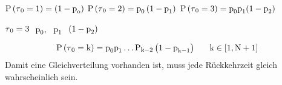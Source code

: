 {\begin{uebsp}
\begin{Answer}
{\centering 
$\normalsubformula{\text{P}}\left(\normalsubformula{\text{$\tau
$}}_{\normalsubformula{\text{0}}}=\normalsubformula{\text{1}}\right)=\left(\normalsubformula{\text{1}}-\normalsubformula{\text{p}}_{\normalsubformula{\text{o}}}\right)$\newline
 $\normalsubformula{\text{P}}\left(\normalsubformula{\text{$\tau
$}}_{\normalsubformula{\text{0}}}=\normalsubformula{\text{2}}\right)=\normalsubformula{\text{p}}_{\normalsubformula{\text{0}}}\left(\normalsubformula{\text{1}}-\normalsubformula{\text{p}}_{\normalsubformula{\text{1}}}\right)$\newline
 $\normalsubformula{\text{P}}\left(\normalsubformula{\text{$\tau
$}}_{\normalsubformula{\text{0}}}=\normalsubformula{\text{3}}\right)=\normalsubformula{\text{p}}_{\normalsubformula{\text{0}}}\normalsubformula{\text{p}}_{\normalsubformula{\text{1}}}(\normalsubformula{\text{1}}-\normalsubformula{\text{p}}_{\normalsubformula{\text{2}}})$\par}

 $\normalsubformula{\text{$\tau
$}}_{\normalsubformula{\text{0}}}=\normalsubformula{\text{3}}\normalsubformula{\text{~}}$
$\normalsubformula{\text{p}}_{\normalsubformula{\text{0}}},\normalsubformula{\text{~}}{\normalsubformula{\text{~}}\normalsubformula{\text{p}}}_{\normalsubformula{\text{1}}}\normalsubformula{\text{~}}$
$\left(\normalsubformula{\text{1}}-\normalsubformula{\text{p}}_{\normalsubformula{\text{2}}}\right)\normalsubformula{\text{~}}$

\begin{equation*}
\normalsubformula{\text{P}}\left(\normalsubformula{\text{$\tau
$}}_{\normalsubformula{\text{0}}}=\normalsubformula{\text{k}}\right)=\normalsubformula{\text{p}}_{\normalsubformula{\text{0}}}\normalsubformula{\text{p}}_{\normalsubformula{\text{1}}}\ldots
\normalsubformula{\text{P}}_{\normalsubformula{\text{k}}-\normalsubformula{\text{2}}}\left(\normalsubformula{\text{1}}-\normalsubformula{\text{p}}_{\normalsubformula{\text{k}}-\normalsubformula{\text{1}}}\right)\normalsubformula{\text{~}}\normalsubformula{\text{~}}\normalsubformula{\text{~}}\normalsubformula{\text{~}}\normalsubformula{\text{~}}\normalsubformula{\text{k}}\in
[\normalsubformula{\text{1}},\normalsubformula{\text{N}}+\normalsubformula{\text{1}}]
\end{equation*}
{
Damit eine Gleichverteilung vorhanden ist, muss jede R\"uckkehrzeit
gleich wahrscheinlich sein.}


\end{Answer}
\end{uebsp}}
